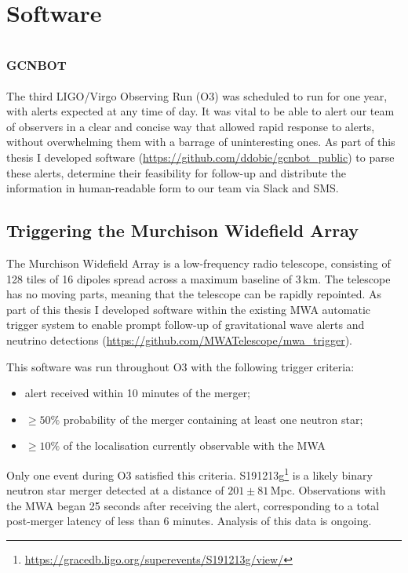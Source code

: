 \chapter{Software}
\label{appendix:software}
\section{\textsc{gcnbot}}
The third LIGO/Virgo Observing Run (O3) was scheduled to run for one year, with alerts expected at any time of day. It was vital to be able to alert our team of observers in a clear and concise way that allowed rapid response to alerts, without overwhelming them with a barrage of uninteresting ones. As part of this thesis I developed software (\url{https://github.com/ddobie/gcnbot_public}) to parse these alerts, determine their feasibility for follow-up and distribute the information in human-readable form to our team via Slack and SMS.

\section{Triggering the Murchison Widefield Array}
The Murchison Widefield Array \citep[MWA;][]{2013PASA...30....7T,2018PASA...35...33W} is a low-frequency radio telescope, consisting of 128 tiles of 16 dipoles spread across a maximum baseline of 3\,km. The telescope has no moving parts, meaning that the telescope can be rapidly repointed. As part of this thesis I developed software within the existing MWA automatic trigger system \citep{2019PASA...36...46H} to enable prompt follow-up of gravitational wave alerts and neutrino detections (\url{https://github.com/MWATelescope/mwa_trigger}). 

This software was run throughout O3 with the following trigger criteria:
\begin{itemize}
    \item alert received within 10 minutes of the merger;
    \item $\geq 50\%$ probability of the merger containing at least one neutron star;
    \item $\geq 10\%$ of the localisation currently observable with the MWA
\end{itemize}
Only one event during O3 satisfied this criteria. S191213g\footnote{\url{https://gracedb.ligo.org/superevents/S191213g/view/}} \citep{GCN26402} is a likely binary neutron star merger detected at a distance of $201\pm 81$\,Mpc. Observations with the MWA began 25 seconds after receiving the alert, corresponding to a total post-merger latency of less than 6 minutes. Analysis of this data is ongoing.

